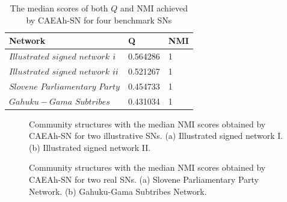 \documentclass[10pt, journal]{IEEEtran}
\begin{document}
\begin{table}[!htbp]
	\caption{The median scores of both $Q$ and NMI achieved by CAEA{\upshape h}-SN for four benchmark SNs}
	\label{table:setting:Benchmark Networks}
	\centering
	\scriptsize
	\begin{tabu} to \linewidth{X[7,c]|X[2,c]|X[2,c]}
		\toprule
		\textbf{Network} 	&	\textbf{Q}	&	\textbf{NMI}		\\
	
		\midrule
		$Illustrated$ $signed$ $network$ $\uppercase\expandafter{\romannumeral1}$	&	0.564286	&	1		\\
		\midrule
		$Illustrated$ $signed$ $network$ $\uppercase\expandafter{\romannumeral2}$	&	0.521267	&	1		\\
		\midrule
		$Slovene$ $Parliamentary$ $Party$ & 0.454733 & 1 	\\
		\midrule
		$Gahuku-Gama$ $Subtribes$ & 0.431034 & 1 	\\	
		\bottomrule
	\end{tabu}
\end{table}

 \begin{figure}[!htbp]
 	\centering
 	\caption{Community structures with the median NMI scores obtained by CAEAh-SN for two illustrative SNs. (a) Illustrated signed network I. (b) Illustrated signed network II.}
 	\label{fig:CAEAh-SN:illustrative}
 \end{figure}






 \begin{figure}[!htbp]
	\centering
 	\caption{Community structures with the median NMI scores obtained by CAEAh-SN for two real SNs. (a) Slovene Parliamentary Party Network. (b) Gahuku-Gama Subtribes Network.}
 	\label{fig:CAEAh-SN:real}
 \end{figure}
\end{document}
